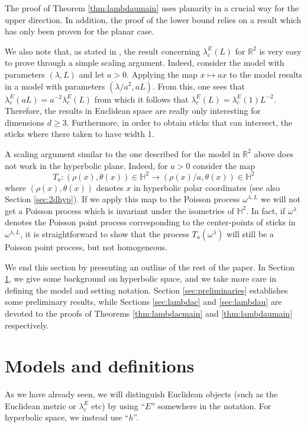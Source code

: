 \documentclass[a4paper,12pt]{article}
\newcommand{\BH}{{\mathbb{H}}}
\newcommand{\BR}{{\mathbb{R}}}
\begin{document}
The proof of Theorem \ref{thm:lambdaumain} uses planarity in a crucial way for the upper 
direction. In addition, the proof of the lower bound relies on a result which has only been 
proven for the planar case. 

 
We also note that, as stated in \cite{B_22}, the result concerning $\lambda_c^E(L)$
for $\BR^2$ is very easy to prove 
through a simple scaling argument. Indeed, consider the model with parameters $(\lambda,L)$ 
and let $a>0$. Applying the map $x\mapsto a x$ to the model results in a model with 
parameters $(\lambda/a^2,a L)$. From this, one sees that $\lambda^E_c(a L)=a^{-2}\lambda^E_c(L)$ from 
which it follows that $\lambda^E_c(L)=\lambda^E_c(1)L^{-2}$. Therefore, the results in Euclidean space 
are really only interesting for dimensions $d \geq 3.$ Furthermore, in order to obtain sticks that 
can intersect, the sticks where there taken to have width 1. 

A scaling argument similar to the one described for the model in $\BR^2$ above 
does not work 
in the hyperbolic plane. Indeed, for $a>0$ consider the map 
\[
T_a: (\rho(x),\theta(x))\in \BH^2 \to (\rho(x)/a,\theta(x))\in \BH^2
\]
where $(\rho(x),\theta(x))$ denotes $x$ in hyperbolic polar coordinates (see 
also Section \ref{sec:2dhyp}). If we apply this map to the Poisson process 
$\omega^{\lambda,L}$ we will not get a Poisson process which is invariant 
under the isometries 
of ${\mathbb H}^2$. In fact, if $\omega^{\lambda}$ denotes the Poisson point process corresponding 
to the center-points of sticks in $\omega^{\lambda,L}$, it is straightforward to show that the process $T_a(\omega^{\lambda})$ will 
still be a Poisson point process, but not homogeneous. 

We end this section by presenting an outline of the rest of the paper. In Section \ref{sec:modelsanddef},
we give some background on hyperbolic space, and we take more care in defining the model and 
setting notation. 
Section \ref{sec:preliminaries} establishes some preliminary results, while Sections 
\ref{sec:lambdac} and \ref{sec:lambdau} are devoted to the proofs of Theorems \ref{thm:lambdacmain}
and \ref{thm:lambdaumain} respectively.


\section{Models and definitions} \label{sec:modelsanddef}
As we have already seen, we will distinguish Euclidean objects (such as the 
Euclidean metric or $\lambda_c^E$ etc) by using ``$E$'' somewhere in the notation. 
For hyperbolic space, we instead use ``$h$''.
\end{document}
